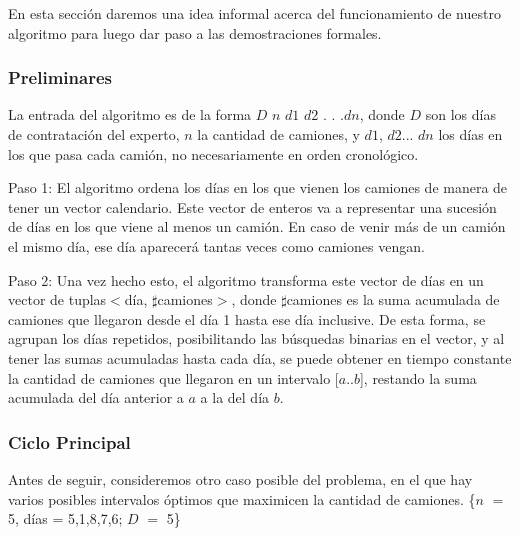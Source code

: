 En esta secci\'on daremos una idea informal acerca del funcionamiento de nuestro algoritmo para luego dar paso a las demostraciones formales.

\vspace{2mm}

\subsubsection{Preliminares}

\vspace{2mm}

La entrada del algoritmo es de la forma $D$ $n$ $d1$ $d2$ . . .$dn$, donde $D$ son los d\'ias de contrataci\'on del experto, $n$ la cantidad de camiones, y $d1$, $d2$... $dn$ los d\'ias en los que pasa cada cami\'on, no necesariamente en orden cronol\'ogico.

\vspace{2mm}

Paso 1: El algoritmo ordena los d\'ias en los que vienen los camiones de manera de tener un vector calendario. Este vector de enteros va a representar una sucesi\'on de d\'ias en los que viene al menos un cami\'on. En caso de venir m\'as de un cami\'on el mismo d\'ia, ese d\'ia aparecer\'a tantas veces como camiones vengan.

\vspace{2mm}

\vspace{2mm}

Paso 2: Una vez hecho esto, el algoritmo transforma este vector de d\'ias en un vector de tuplas$<$d\'ia, $\sharp$camiones$>$, donde $\sharp$camiones es la suma acumulada de camiones que llegaron desde el d\'ia 1 hasta ese d\'ia inclusive. De esta forma, se agrupan los d\'ias repetidos, posibilitando las b\'usquedas binarias en el vector, y al tener las sumas acumuladas hasta cada d\'ia, se puede obtener en tiempo constante la cantidad de camiones que llegaron en un intervalo [$a$..$b$], restando la suma acumulada del d\'ia anterior a $a$ a la del d\'ia $b$.

\vspace{2mm}

\subsubsection{Ciclo Principal}

\vspace{2mm}

Antes de seguir, consideremos otro caso posible del problema, en el que hay varios posibles intervalos \'optimos que maximicen la cantidad de camiones.
\{$n$ $=$ 5, d\'ias = 5,1,8,7,6; $D$ $=$ 5\}

